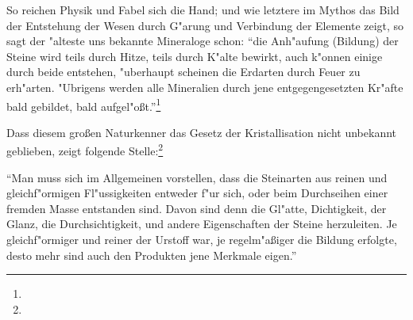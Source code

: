 \documentclass[a4paper, 11pt, oneside, polutonikogreek, german]{article}
\begin{document}
So reichen Physik und Fabel sich die Hand; und wie letztere im Mythos das Bild der Entstehung der Wesen durch G"arung und Verbindung der Elemente zeigt, so sagt der "alteste uns bekannte Mineraloge schon: "`die Anh"aufung (Bildung) der Steine wird teils durch Hitze, teils durch K"alte bewirkt, auch k"onnen einige durch beide entstehen, "uberhaupt scheinen die Erdarten durch Feuer zu erh"arten. "Ubrigens werden alle Mineralien durch jene entgegengesetzten Kr"afte bald gebildet, bald aufgel"oßt."'\footnote{}

Dass diesem großen Naturkenner das Gesetz der Kristallisation nicht unbekannt geblieben, zeigt folgende Stelle:\footnote{}

"`Man muss sich im Allgemeinen vorstellen, dass die Steinarten aus reinen und gleichf"ormigen Fl"ussigkeiten entweder f"ur sich, oder beim Durchseihen einer fremden Masse entstanden sind. Davon sind denn die Gl"atte, Dichtigkeit, der Glanz, die Durchsichtigkeit, und andere Eigenschaften der Steine herzuleiten. Je gleichf"ormiger und reiner der Urstoff war, je regelm"aßiger die Bildung erfolgte, desto mehr sind auch den Produkten jene Merkmale eigen."'
\end{document}
